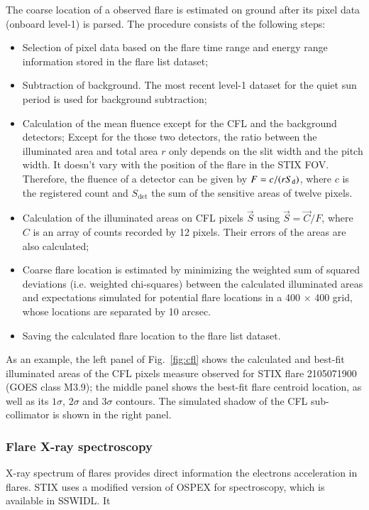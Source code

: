 \documentclass[referee]{aa} %
\begin{document}
The coarse location of a  observed flare is estimated on ground after its pixel data (onboard level-1) is parsed.
The procedure consists of the following steps:
\begin{itemize}
  \item Selection of pixel data based on the flare time range and energy range information stored in the flare list dataset;
  \item Subtraction of background. The most recent level-1 dataset for the quiet sun period is used for background subtraction;
  \item Calculation of the mean fluence except for the CFL and the background detectors; 
      Except for the those two detectors, the ratio between the illuminated area and total area $r$ only depends on the 
      slit width and the pitch width. It doesn't vary with the position of the flare in the STIX FOV.  
      Therefore, the fluence of a detector can be given by $F=c/(r S_{\rm d})$,  where $c$ is the registered 
      count and $S_\textrm{det}$ the sum of the sensitive areas of twelve pixels. 
  \item Calculation of the illuminated areas on CFL pixels $\vec{S}$ using $\vec{S} = \vec{C}/F$, where $C$  is an array of counts 
  recorded by 12 pixels. Their errors of the areas are also calculated; 
  \item  Coarse flare location is estimated by minimizing the weighted sum of squared deviations 
  (i.e. weighted chi-squares) between  the calculated illuminated areas and  expectations
  simulated for potential flare locations in a 400 $\times$ 400 grid, whose locations are separated by 10 arcsec.  
  \item Saving the calculated flare location to the flare list dataset. 
\end{itemize}
As an example, the left panel of Fig.~\ref{fig:cfl} shows the calculated and best-fit illuminated areas 
of the CFL pixels measure observed for STIX flare 2105071900 (GOES class M3.9);   the middle panel shows the best-fit 
flare centroid location, as well as its $1\sigma$, $2\sigma$ and $3\sigma$ contours. 
The simulated shadow of the CFL sub-collimator  is shown in the right panel. 
\subsubsection{Flare X-ray spectroscopy}
X-ray spectrum of  flares provides direct information 
the electrons acceleration in flares. STIX uses a modified version of OSPEX for spectroscopy, which is available in SSWIDL.
It 
\end{document}
